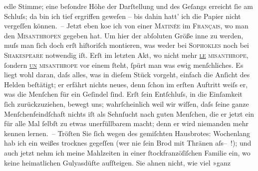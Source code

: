 \begin{ledgroupsized}[t]{13cm}
               edle Stimme; eine beſondre Höhe der Darſtellung und des Geſangs erreicht ſie am
               Schluſs; da bin ich tief ergriffen geweſen – bis dahin hatt’ ich die Papier nicht vergeſſen können. –\pend
           \pstart
           Jetzt eben ko{\geminationm}e ich von einer \textsc{Matinée} im \textsc{Français}, wo man den \textsc{Misanthropen} gegeben hat. Um hier der abſoluten Größe inne zu werden, muſs man ſich doch
               erſt hiſtoriſch montieren, was weder bei \textsc{Sophokles} noch bei \textsc{Shakespeare} notwendig iſt. Erſt im letzten Akt, {\pb}wo nicht mehr
                  \textsc{\uline{le} misanthrope}, ſondern \textsc{\uline{un} misanthrope} vor einem ſteht, ſpürt man was
               ewig menſchliches. Es liegt wohl daran, daſs alles, was in dieſem Stück vorgeht, einfach die Anſicht des
               Helden beſtätigt; er erfährt nichts neues, denn ſchon im erſten Auftritt weiſs er,
               was die Menſchen für ein Geſindel ſind. Erſt ſein Entſchluſs, in die Einſamkeit ſich
               zurückzuziehen, bewegt uns; wahrſcheinlich weil wir wiſſen, daſs ſeine ganze
               Menſchenfeindſchaft nichts {\pb}iſt als Sehnſucht nach guten
               Menſchen, die er jetzt ein für alle Mal ſelbſt zu etwas unerfüllbarem macht; denn er
               wird niemanden mehr kennen lernen. –\pend
           \pstart
           Tröſten Sie ſich wegen des gemiſchten Hausbrotes: Wochenlang hab ich ein weißes
               trocknes gegeſſen (wer nie ſein Brod mit Thränen
                  aſs– !); und auch jetzt nehm ich meine Mahlzeiten in einer ſtockfranzöſiſchen Familie ein, wo keine heimatlichen {\pb}Gulyasdüfte aufſteigen. Sie ahnen nicht, wie viel »ganz

\end{ledgroupsized}
